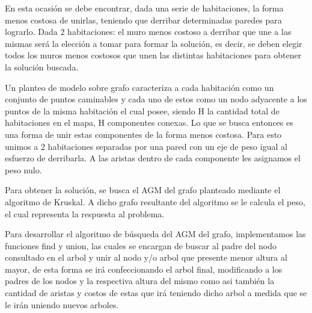 En esta ocasión se debe encontrar, dada una serie de habitaciones, la forma menos costosa de unirlas, teniendo que derribar determinadas paredes para lograrlo. Dada 2 habitaciones: el muro menos costoso a derribar que une a las mismas será la elección a tomar para formar la solución, es decir, se deben elegir todos los muros menos costosos que unen las distintas habitaciones para obtener la soluci\'on buscada.

Un planteo de modelo sobre grafo caracteriza a cada habitación como un conjunto de puntos caminables y cada uno de estos como un nodo adyacente a los puntos de la misma habitaci\'on el cual posee, siendo H la cantidad total de habitaciones en el mapa, H componentes conexas. Lo que se busca entonces es una forma de unir estas componentes de la forma menos costosa. Para esto unimos a 2 habitaciones separadas por una pared con un eje de peso igual al esfuerzo de derribarla. A las aristas dentro de cada componente les asignamos el peso nulo.

Para obtener la soluci\'on, se busca el AGM del grafo planteado mediante el algoritmo de Kruskal. A dicho grafo resultante del algoritmo se le calcula el peso, el cual representa la respuesta al problema.

Para desarrollar el algoritmo de b\'usqueda del AGM del grafo, implementamos las funciones find y union, las cuales se encargan de buscar al padre del nodo consultado en el arbol y unir al nodo y/o arbol que presente menor altura al mayor, de esta forma se ir\'a confeccionando el arbol final, modificando a los padres de los nodos y la respectiva altura del mismo como asi tambi\'en la cantidad de aristas y costos de estas que ir\'a teniendo dicho arbol a medida que se le ir\'an uniendo nuevos arboles.

